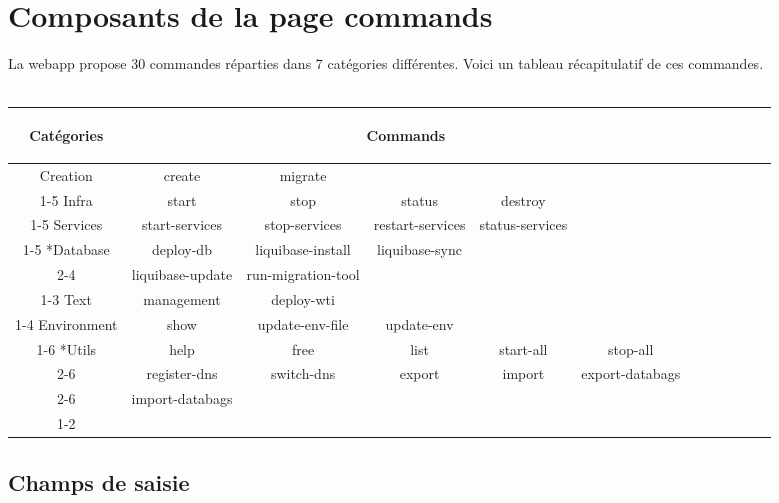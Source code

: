 \section{Composants de la page commands}

La webapp propose 30 commandes réparties dans 7 catégories différentes.
Voici un tableau récapitulatif de ces commandes.\\\\
\begin{tabular}{|c|c|c|c|c|c|c|c|c|c|c|c|}
  \hline
  \begin{bf}Catégories\end{bf} & \multicolumn{5}{c|}{\begin{bf}Commands\end{bf}} \\
    \hline
    Creation & create & migrate \\
    \cline{1-5}
    Infra & start & stop & status & destroy \\
    \cline{1-5}
    Services & start-services & stop-services & restart-services & status-services \\
    \cline{1-5}
    \multirow{2}*{Database} & deploy-db & liquibase-install & liquibase-sync\\
    \cline{2-4}
    & liquibase-update & run-migration-tool  \\
    \cline{1-3}
    Text & management & deploy-wti \\
    \cline{1-4}
    Environment & show & update-env-file & update-env \\
    \cline{1-6}
    \multirow{3}*{Utils} & help & free & list & start-all & stop-all \\
    \cline{2-6}
    & register-dns & switch-dns & export & import & export-databags\\
    \cline{2-6}
    & import-databags \\
    \cline{1-2}
\end{tabular}


\subsection{Champs de saisie}


